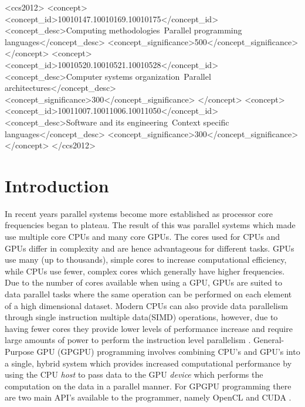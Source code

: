 \documentclass{sig-alternate-05-2015}
\begin{document}
%
%

\begin{CCSXML}
	<ccs2012>
	<concept>
	<concept_id>10010147.10010169.10010175</concept_id>
	<concept_desc>Computing methodologies~Parallel programming
	languages</concept_desc>
	<concept_significance>500</concept_significance>
	</concept>
	<concept>
	<concept_id>10010520.10010521.10010528</concept_id>
	<concept_desc>Computer systems organization~Parallel
	architectures</concept_desc>
	<concept_significance>300</concept_significance>
	</concept>
	<concept>
	<concept_id>10011007.10011006.10011050</concept_id>
	<concept_desc>Software and its engineering~Context specific
	languages</concept_desc>
	<concept_significance>300</concept_significance>
	</concept>
	</ccs2012>
\end{CCSXML}

%
%

%
%
\printccsdesc



\section{Introduction}\label{sec:intro}
In recent years parallel systems become more established as processor core
frequencies began to plateau. The result of this was parallel systems which made
use multiple core CPUs and many core GPUs. The cores used for CPUs and GPUs differ 
in complexity and are hence advantageous for different tasks. GPUs use many 
(up to thousands), simple cores to increase computational efficiency, while CPUs 
use fewer, complex cores which generally have higher frequencies. Due to the
number of cores available when using a GPU, GPUs are suited to data parallel
tasks where the same operation can be performed on each element of a high
dimensional dataset. Modern CPUs can also provide data parallelism through
single instruction multiple data(SIMD) operations, however, due to having fewer
cores they provide lower levels of performance increase and require large
amounts of power to perform the instruction level parallelism \cite{kumar:power}.
General-Purpose GPU (GPGPU) programming involves combining CPU's and GPU's 
into a single, hybrid system which provides increased computational performance 
by using the CPU \textit{host} to pass data to the GPU \textit{device} which 
performs the computation on the data in a parallel manner.
For GPGPU programming there are two main API's available to the programmer, 
namely OpenCL \cite{opencl} and CUDA \cite{cuda}. 
\end{document}
